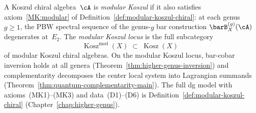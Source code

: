 \begin{definition}\label{def:modular-koszul-preview}
A Koszul chiral algebra~$\cA$ is \emph{modular Koszul}
if it also satisfies axiom~\ref{MK:modular}
of Definition~\ref{def:modular-koszul-chiral}:
at each genus $g \geq 1$, the PBW spectral sequence of the
genus-$g$ bar construction $\barB^{(g)}_X(\cA)$ degenerates
at~$E_2$.
The \emph{modular Koszul locus} is the full subcategory
\[
\operatorname{Kosz}^{\mathrm{mod}}(X)
\;\subset\;
\operatorname{Kosz}(X)
\]
of modular Koszul chiral algebras.
On the modular Koszul locus, bar-cobar inversion holds at all
genera (Theorem~\ref{thm:higher-genus-inversion}) and
complementarity decomposes the center local system into
Lagrangian summands
(Theorem~\ref{thm:quantum-complementarity-main}).
The full dg model with axioms~(MK1)--(MK3) and data~(D1)--(D6)
is Definition~\ref{def:modular-koszul-chiral}
(Chapter~\ref{chap:higher-genus}).
\end{definition}


